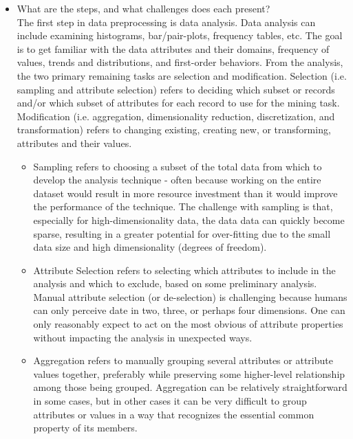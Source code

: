 \documentclass[fleqn,10pt]{SelfArx} %
\begin{document}
\begin{itemize}[noitemsep]

\item What are the steps, and what challenges does each present?\\
  The first step in data preprocessing is data analysis.  Data analysis can include examining histograms, bar/pair-plots, frequency tables, etc.  The goal is to get familiar with the data attributes and their domains, frequency of values, trends and distributions, and first-order behaviors.  From the analysis, the two primary remaining tasks are selection and modification.  Selection (i.e. sampling and attribute selection) refers to deciding which subset or records and/or which subset of attributes for each record to use for the mining task.  Modification (i.e. aggregation, dimensionality reduction, discretization, and transformation) refers to changing existing, creating new, or transforming, attributes and their values.

\begin{itemize}
	
	\item Sampling refers to choosing a subset of the total data from which to develop the analysis technique - often because working on the entire dataset would result in more resource investment than it would improve the performance of the technique.  The challenge with sampling is that, especially for high-dimensionality data, the data data can quickly become sparse, resulting in a greater potential for over-fitting due to the small data size and high dimensionality (degrees of freedom).
	
	\item Attribute Selection refers to selecting which attributes to include in the analysis and which to exclude, based on some preliminary analysis.  Manual attribute selection (or de-selection) is challenging because humans can only perceive date in two, three, or perhaps four dimensions.  One can only reasonably expect to act on the most obvious of attribute properties without impacting the analysis in unexpected ways.
	
	\item Aggregation refers to manually grouping several attributes or attribute values together, preferably while preserving some higher-level relationship among those being grouped.  Aggregation can be relatively straightforward in some cases, but in other cases it can be very difficult to group attributes or values in a way that recognizes the essential common property of its members.
	

\end{itemize}
\end{itemize}
\end{document}
